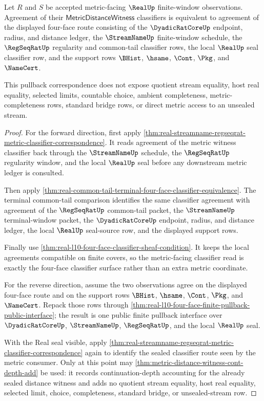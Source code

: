 \begin{theorem}
\label{thm:real-l10-metric-classifier-pullback-correspondence}
Let $R$ and $S$ be accepted metric-facing $\RealUp$ finite-window
observations. Agreement of their $\mathsf{MetricDistanceWitness}$ classifiers
is equivalent to agreement of the displayed four-face route consisting of the
$\DyadicRatCoreUp$ endpoint, radius, and distance ledger, the $\StreamNameUp$
finite-window schedule, the $\RegSeqRatUp$ regularity and common-tail
classifier rows, the local $\RealUp$ seal classifier row, and the support rows
$\BHist$, $\hsame$, $\Cont$, $\Pkg$, and $\NameCert$.

This pullback correspondence does not expose quotient stream equality, host
real equality, selected limits, countable choice, ambient completeness,
metric-completeness rows, standard bridge rows, or direct metric access to an
unsealed stream.
\end{theorem}
\begin{proof}
For the forward direction, first apply
\autoref{thm:real-streamname-regseqrat-metric-classifier-correspondence}. It
reads agreement of the metric witness classifier back through the
$\StreamNameUp$ schedule, the $\RegSeqRatUp$ regularity window, and the local
$\RealUp$ seal before any downstream metric ledger is consulted.

Then apply
\autoref{thm:real-common-tail-terminal-four-face-classifier-equivalence}. The
terminal common-tail comparison identifies the same classifier agreement with
agreement of the $\RegSeqRatUp$ common-tail packet, the $\StreamNameUp$
terminal-window packet, the $\DyadicRatCoreUp$ endpoint, radius, and distance
ledger, the local $\RealUp$ seal-source row, and the displayed support rows.

Finally use \autoref{thm:real-l10-four-face-classifier-sheaf-condition}. It
keeps the local agreements compatible on finite covers, so the metric-facing
classifier read is exactly the four-face classifier surface rather than an
extra metric coordinate.

For the reverse direction, assume the two observations agree on the displayed
four-face route and on the support rows $\BHist$, $\hsame$, $\Cont$, $\Pkg$,
and $\NameCert$. Repack those rows through
\autoref{thm:real-l10-four-face-finite-pullback-public-interface}; the result
is one public finite pullback interface over $\DyadicRatCoreUp$,
$\StreamNameUp$, $\RegSeqRatUp$, and the local $\RealUp$ seal.

With the Real seal visible, apply
\autoref{thm:real-streamname-regseqrat-metric-classifier-correspondence} again
to identify the sealed classifier route seen by the metric consumer. Only at
this point may \autoref{thm:metric-distance-witness-cont-depth-add} be used:
it records continuation-depth accounting for the already sealed distance
witness and adds no quotient stream equality, host real equality, selected
limit, choice, completeness, standard bridge, or unsealed-stream row.
\end{proof}

